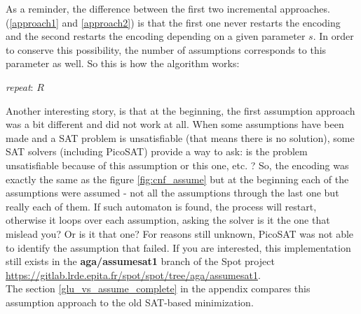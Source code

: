 \noindent As a reminder, the difference between the first two incremental approaches.
(\ref{approach1} and \ref{approach2}) is that the first one never restarts the encoding and the second
restarts the encoding depending on a given parameter $s$. In order to
conserve this possibility, the number of assumptions corresponds to this parameter as well. So this is
how the algorithm works:\\

\begin{algorithm}[H]
 \caption{}
 \label{assume}
 \begin{algorithmic}[1]
   \BState \emph{repeat}:
    \Return $R$\EndIf
   \Else
   \EndIf
  \EndProcedure
 \end{algorithmic}
\end{algorithm}

Another interesting story, is that at the beginning, the first assumption
approach was a bit different and did not work at all. When some assumptions have been made and a SAT
problem is unsatisfiable (that means there is no solution), some SAT solvers (including PicoSAT) provide a
way to ask: is the problem unsatisfiable because of this assumption or this one, etc. ?
So, the encoding was exactly the same as the figure \ref{fig:cnf_assume} but at the beginning each of
the assumptions were assumed - not all the assumptions through the last one but really each of them.
If such automaton is found, the process will restart, otherwise it loops over each assumption, asking the
solver is it the one that mislead you? Or is it that one? For reasons still unknown, PicoSAT was not able
to identify the assumption that failed. If you are interested, this implementation still exists in the
\textbf{aga/assumesat1} branch of the Spot project
\url{https://gitlab.lrde.epita.fr/spot/spot/tree/aga/assumesat1}.\\

\noindent The section \ref{glu_vs_assume_complete} in the appendix compares this assumption approach to
the old SAT-based minimization.

